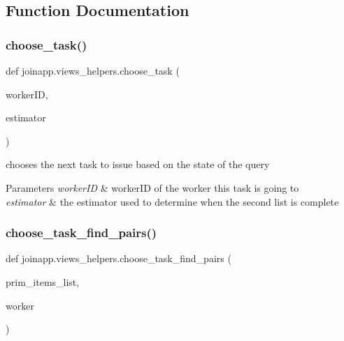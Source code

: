 \subsection{Function Documentation}
\mbox{\label{namespacejoinapp_1_1views__helpers_a83cad79c1fca193b0ff978b9fddf0bfb}} 
\subsubsection{\texorpdfstring{choose\_task()}{choose\_task()}}
{\footnotesize\ttfamily def joinapp.\+views\+\_\+helpers.\+choose\+\_\+task (\begin{DoxyParamCaption}\item[{}]{worker\+ID,  }\item[{}]{estimator }\end{DoxyParamCaption})}



chooses the next task to issue based on the state of the query 


\begin{DoxyParams}{Parameters}
{\em worker\+ID} & worker\+ID of the worker this task is going to \\
\hline
{\em estimator} & the estimator used to determine when the second list is complete \\
\hline
\end{DoxyParams}
\mbox{\label{namespacejoinapp_1_1views__helpers_add72af02158504b79ecb6a29f5dfdb4e}} 
\subsubsection{\texorpdfstring{choose\_task\_find\_pairs()}{choose\_task\_find\_pairs()}}
{\footnotesize\ttfamily def joinapp.\+views\+\_\+helpers.\+choose\+\_\+task\+\_\+find\+\_\+pairs (\begin{DoxyParamCaption}\item[{}]{prim\+\_\+items\+\_\+list,  }\item[{}]{worker }\end{DoxyParamCaption})}



